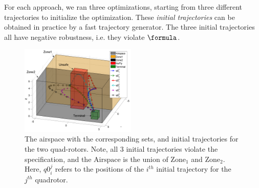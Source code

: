 For each approach, we ran three optimizations, starting from three different trajectories to initialize the optimization. These \textit{initial trajectories} can be obtained in practice by a fast trajectory generator. 
The three initial trajectories all have negative robustness, i.e. they violate $\formula$.
\begin{figure}[t]
\centering
\includegraphics[width=0.49\textwidth]{figures/QuadInitTrajs_scissored}
\caption{The airspace with the corresponding sets, and initial trajectories for the two quad-rotors. Note, all 3 initial trajectories violate the specification, and the $\text{Airspace}$ is the union of $\text{Zone}_1$ and $\text{Zone}_2$. Here, $q0_{i}^j$ refers to the positions of the $i^{th}$ initial trajectory for the $j^{th}$ quadrotor.} 
\label{fig:quad_init}
\end{figure}


